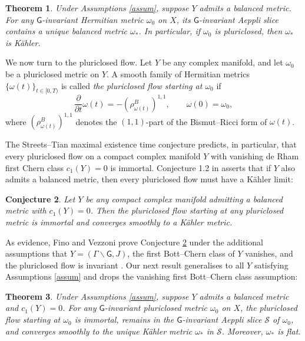 \documentclass[11pt,reqno]{amsart}
\newcommand{\G}{\mathsf {G}}
\renewcommand{\S}{\mathcal S}
\theoremstyle{plain}
\newtheorem{introtheorem}{Theorem}
\newtheorem{introconjecture}[introtheorem]{Conjecture}
\theoremstyle{definition}
\theoremstyle{remark}
\begin{document}
\begin{introtheorem}
    \label{thm tech 1}
    Under Assumptions \ref{assum}, suppose $Y$ admits a balanced metric. For any $\G$-invariant Hermitian metric $\omega_0$ on $X$, its $\G$-invariant Aeppli slice contains  
   a unique balanced metric $\omega_*$. In particular, if $\omega_0$ is pluriclosed, then $\omega_*$ is K\"ahler.
\end{introtheorem}

We now turn to the pluriclosed flow. Let $Y$ be any complex manifold, and let $\omega_0$ be a pluriclosed metric on $Y$. A smooth family of Hermitian metrics $\{\omega(t)\}_{t \in [0, T)}$ is called \textit{the pluriclosed flow starting at $\omega_0$} if 
$$\frac{\partial}{\partial t} \omega(t) = - (\rho^B_{\omega(t)})^{1,1}, \qquad \omega(0) = \omega_0,$$
 where $(\rho^B_{\omega(t)})^{1,1}$ denotes the $(1,1)$-part of the Bismut--Ricci form of $\omega(t)$.  
 
The Streets--Tian maximal existence time conjecture \cite[Conjecture 3.6]{streets_survey} predicts, in particular, that every pluriclosed flow on a compact complex manifold $Y$ with vanishing de Rham first Chern class $c_1(Y) = 0$ is immortal. Conjecture 1.2  in \cite{fino2026} asserts that if $Y$ also admits a balanced metric, then every pluriclosed flow must have a K\"ahler limit:
 \begin{introconjecture}
    \label{second conj}
     Let $Y$ be any compact complex manifold admitting a balanced metric with $c_1(Y) = 0$. Then the pluriclosed flow starting at any pluriclosed metric is immortal and converges smoothly to a K\"ahler metric.
 \end{introconjecture}

As evidence, Fino and Vezzoni prove Conjecture \ref{second conj} under the additional assumptions that $Y = (\Gamma \backslash \G, J)$, the first Bott--Chern class of $Y$ vanishes, and the pluriclosed flow is invariant \cite[Theorem 1.3]{fino2026}. Our next result generalises \cite[Theorem 1.3]{fino2026} to all $Y$ satisfying Assumptions \ref{assum} and drops the vanishing first Bott--Chern class assumption:

\begin{introtheorem}
    \label{thm tech 2}
    Under Assumptions \ref{assum}, suppose $Y$ admits a balanced metric and $c_1(Y) = 0$. For any $\G$-invariant pluriclosed metric $\omega_0$ on $X$, the pluriclosed flow starting at $\omega_0$ is immortal, remains in the $\G$-invariant Aeppli slice $\S$ of $\omega_0$, and converges smoothly to the unique K\"ahler metric $\omega_*$ in $\S$. Moreover, $\omega_*$ is flat. 
\end{introtheorem}
\end{document}
